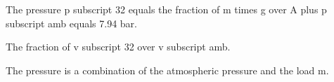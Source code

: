 The pressure p subscript 32 equals the fraction of m times g over A plus p subscript amb equals 7.94 bar.

The fraction of v subscript 32 over v subscript amb.

The pressure is a combination of the atmospheric pressure and the load m.